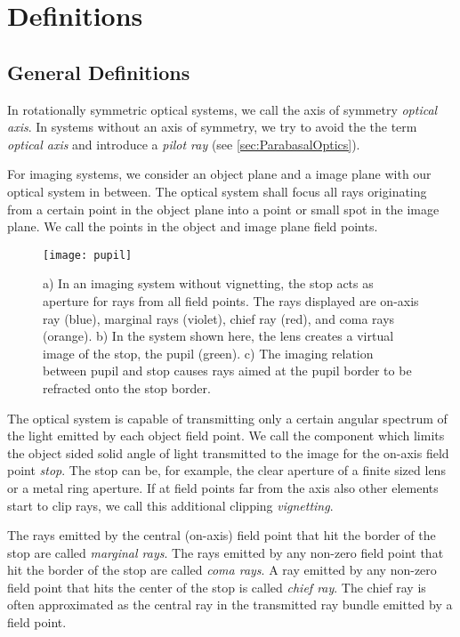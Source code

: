 \documentclass[12pt,a4paper,twoside,openright,BCOR10mm,headsepline,titlepage,abstracton,chapterprefix,final]{scrreprt}
\begin{document}
\section{Definitions}

\subsection{General Definitions}
In rotationally symmetric optical systems, we call the axis of symmetry \emph{optical axis}. 
In systems without an axis of symmetry, we try to avoid the the term \emph{optical axis}
and introduce a \emph{pilot ray} (see \ref{sec:ParabasalOptics}).

For imaging systems, we consider an object plane and a image plane with our optical system in between. 
The optical system shall focus all rays originating from a certain point in the object plane into a point or small spot in the image plane.
We call the points in the object and image plane field points.

\begin{figure}
  \centering
   \texttt{[image: pupil]}
  \caption{a) In an imaging system without vignetting, the stop acts as aperture for rays from all field points. The rays displayed are on-axis ray (blue), marginal rays (violet), chief ray (red), and coma rays (orange).
  b) In the system shown here, the lens creates a virtual image of the stop, the pupil (green).
  c) The imaging relation between pupil and stop causes rays aimed at the pupil border to be refracted onto the stop border.
  }
  \label{fig:pupil}
\end{figure}

The optical system is capable of transmitting only a certain angular spectrum of the light emitted by each object field point.
We call the component which limits the object sided solid angle of light transmitted to the image for the on-axis field point \emph{stop}.
The stop can be, for example, the clear aperture of a finite sized lens or a metal ring aperture.
If at field points far from the axis also other elements start to clip rays, we call this additional clipping \emph{vignetting}.

The rays emitted by the central (on-axis) field point that hit the border of the stop are called \emph{marginal rays}.
The rays emitted by any non-zero field point that hit the border of the stop are called \emph{coma rays}.
A ray emitted by any non-zero field point that hits the center of the stop is called \emph{chief ray}.
The chief ray is often approximated as the central ray in the transmitted ray bundle emitted by a field point.
\end{document}
